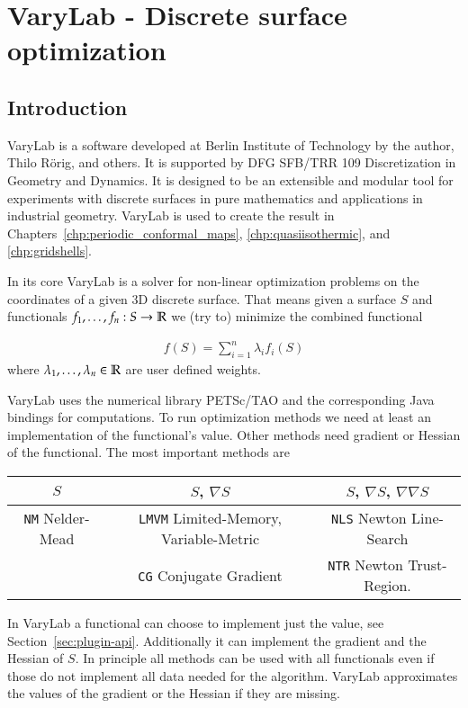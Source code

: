 \documentclass[Thesis.tex]{subfiles}
\begin{document}
\chapter{{\sc VaryLab} - Discrete surface optimization}
\label{chp:varylab}

\section{Introduction}

{\sc VaryLab} is a software developed at Berlin Institute of Technology by the author, Thilo R\"orig, and others. It is supported by DFG SFB/TRR 109 Discretization in Geometry and Dynamics. It is designed to be an extensible and modular tool for experiments with discrete surfaces in pure mathematics and applications in industrial geometry. {\sc VaryLab} is used to create the result in Chapters~\ref{chp:periodic_conformal_maps}, \ref{chp:quasiisothermic}, and \ref{chp:gridshells}.

In its core {\sc VaryLab} is a solver for non-linear optimization problems on the coordinates of a given 3D discrete surface. That means given a surface $S$ and functionals $f_1,\ldots,f_n:S\to\mathbb R$ we (try to) minimize the combined functional

\begin{eqnarray*}
	f(S) = \sum_{i=1}^n \lambda_i f_i(S)
\end{eqnarray*}
where $\lambda_1,\ldots,\lambda_n\in \mathbb R$ are user defined weights. 

{\sc VaryLab} uses the numerical library {\sc PETSc}/{\sc TAO} \cite{petsc-user-ref, petsc-web-page, tao-user-ref} and the corresponding {\sc Java} bindings \cite{jpetsctao-web-page} for computations. To run optimization methods we need at least an implementation of the functional's value. Other methods need gradient or Hessian of the functional. The most important methods are
 
\begin{tabular}{c | c | c}
	$S$ & $S$, $\nabla S$ & $S$, $\nabla S$, $\nabla\nabla S$\\ \hline
	{\tt NM} Nelder-Mead & {\tt LMVM} Limited-Memory, Variable-Metric & {\tt NLS} Newton Line-Search \\
	& {\tt CG} Conjugate Gradient & {\tt NTR} Newton Trust-Region.
\end{tabular}

In {\sc VaryLab} a functional can choose to implement just the value, see Section~\ref{sec:plugin-api}. Additionally it can implement the gradient and the Hessian of $S$. In principle all methods can be used with all functionals even if those do not implement all data needed for the algorithm. {\sc VaryLab} approximates the values of the gradient or the Hessian if they are missing. 
\end{document}
